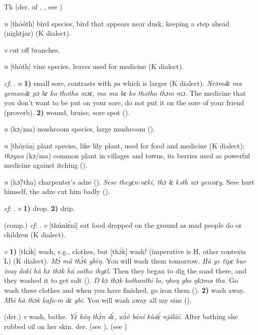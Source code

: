 \begin{letter}{Th}
 (der. of , , see ) 

\textit{n} [thóóth] bird species, bird that appears near dusk, keeping a step ahead (nightjar) (K dialect). 

 \textit{v} cut off branches.

 \textit{n} [thòth] vine species, leaves used for medicine (K dialect). 

 \textit{cf}: . \textit{n} \textbf{1)} small sore, contrasts with \textit{pa} which is larger (K dialect). \textit{Nrɔmdɛ ma yemandɛ pɔ bɛ ko thotho mɔɛ, ma ma bɛ ko thotho thɔm mɔ.} The medicine that you don't want to be put on your sore, do not put it on the sore of your friend (proverb). \textbf{2)} wound, bruise, sore spot (\citealt{Pichl1967}).

 \textit{n} (kɔ/ma) mushroom species, large mushroom (\citealt{Pichl1967}). 

 \textit{n} [thòyán] plant species, like lily plant, used for food and medicine (K dialect); \textit{thɔyan} (kɔ/ma) common plant in villages and towns, its berries used as powerful medicine against itching (\citealt{Pichl1967}).

 \textit{n} (hɔ̃/tha) charpenter's adze (\citealt{Pichl1967}). \textit{Sese theyɛn-nɛki, thɔ lɛ kəth wɔ yenwɛy.} Sese hurt himself, the adze cut him badly (\citealt{Pichl1967}).

 \textit{cf}: . \textit{v} \textbf{1)} drop. \textbf{2)} drip.

 (comp.) \textit{cf}: . \textit{v} [thúníɛ́nì] eat food dropped on the ground as mad people do or children (K dialect).

 \textit{v} \textbf{1)} [thɔ̀k] wash, e.g., clothes, but [thɔ́k] wash! (imperative is H, other contexts L) (K dialect). \textit{Mɔ́ má thɔ̀k gbèŋ.} You will wash them tomorrow. \textit{Hã ye tipɛ bue isuŋ doki hã hɔ thɔk hã sotho ihyɛl.} Then they began to dig the sand there, and they washed it to get salt (\citealt{Pichl1967}). \textit{Ŋ kɔ thɔk kothanthi lo, ŋkoŋ gbo ŋkɔma tha.} Go wash these clothes and when you have finished, go iron them (\citealt{Pichl1967}). \textbf{2)} wash away. \textit{Mbi hã thɔk kafa-m dɛ gbi.} You will wash away all my sins (\citealt{Pichl1967}). 

 (der.) \textit{v} wash, bathe. \textit{Yɛ̀ kóŋ thɔ̀n dɛ̀, wɔ̀è bání kùáɛ́ njáláí.} After bathing she rubbed oil on her skin. der.  (see ),  (see )


\end{letter}
